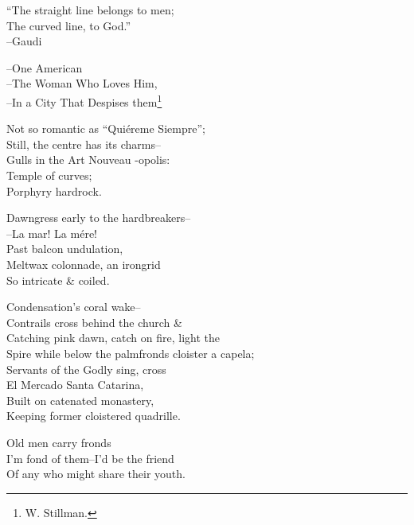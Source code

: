 


``The straight line belongs to men; \\
The curved line, to God.'' \\
\hfill --Gaudi

--One American \\
--The Woman Who Loves Him, \\
--In a City That Despises them\footnote{W. Stillman.}

Not so romantic as ``Quiéreme Siempre''; \\
Still, the centre has its charms-- \\
Gulls in the Art Nouveau -opolis: \\
Temple of curves; \\
Porphyry hardrock.

Dawngress early to the hardbreakers-- \\
--La mar! La mére! \\
Past balcon undulation, \\
Meltwax colonnade, an irongrid \\
So intricate \& coiled.

Condensation's coral wake-- \\
Contrails cross behind the church \& \\
Catching pink dawn, catch on fire, light the \\
Spire while below the palmfronds cloister a capela; \\  
Servants of the Godly sing, cross \\
El Mercado Santa Catarina, \\
Built on catenated monastery, \\
Keeping former cloistered quadrille.

Old men carry fronds \\
I'm fond of them--I'd be the friend \\
Of any who might share their youth.

